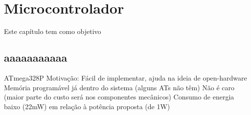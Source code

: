     \chapter{Microcontrolador}
\label{CAP3}


Este capítulo tem como objetivo 


\section{aaaaaaaaaaa}\label{Sub:equa}
ATmega328P
Motivação:
Fácil de implementar, ajuda na ideia de open-hardware
Memória programável já dentro do sistema (alguns ATs não têm)
Não é caro (maior parte do custo será nos componentes mecânicos)
Consumo de energia baixo (22mW) em relação à potência proposta (de 1W)

